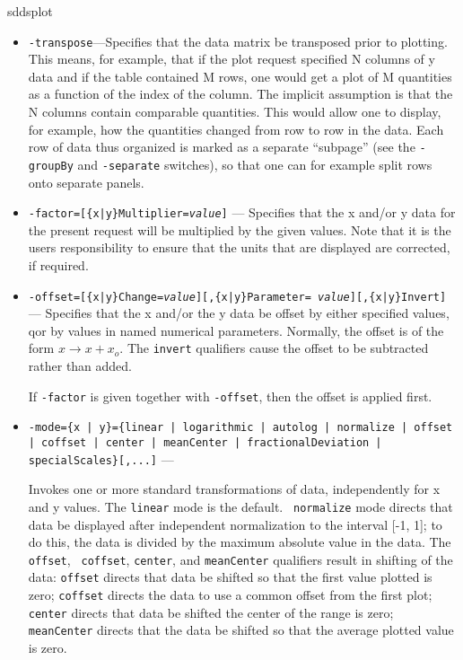 \begin{sddsprog}{sddsplot}
\begin{itemize}
\begin{itemize}
  \item {\tt -transpose}---Specifies that the data matrix be transposed prior to plotting.  This
means, for example, that if the plot request specified N columns of y data and if the table contained
M rows, one would get a plot of M quantities as a function of the index of the column.  The implicit
assumption is that the N columns contain comparable quantities.  This would allow one to display, for
example, how the quantities changed from row to row in the data.  Each row of data thus organized is
marked as a separate ``subpage'' (see the {\tt -groupBy} and {\tt -separate} switches), so that one
can for example split rows onto separate panels.

  \item {\tt -factor=[\{x|y\}Multiplier={\em value}]} --- Specifies that the x
and/or y data for the present request will be multiplied by the given values.  Note that it is the
users responsibility to ensure that the units that are displayed are corrected, if required.

  \item {\tt -offset=[\{x|y\}Change={\em value}][,\{x|y\}Parameter={\em
value}][,\{x|y\}Invert]} --- Specifies that the x and/or the y data be
offset by either specified values, qor by values in named numerical
parameters.  Normally, the offset is of the form $x \rightarrow
x+x_o$.  The {\tt invert} qualifiers cause the offset to be subtracted
rather than added.

If {\tt -factor} is given together with {\tt -offset}, then the offset is applied first.

  \item {\tt -mode=\{x | y\}=\{linear | logarithmic | autolog | normalize | offset | coffset | center | meanCenter | fractionalDeviation | specialScales\}[,...]} ---

Invokes one or more standard transformations of data, independently
for x and y values.  The {\tt linear} mode is the default.  {\tt
normalize} mode directs that data be displayed after independent
normalization to the interval [-1, 1]; to do this, the data is divided
by the maximum absolute value in the data.  The {\tt offset}, {\tt
coffset}, {\tt center}, and {\tt meanCenter} qualifiers result in 
shifting of the data: {\tt offset} directs that data be shifted so 
that the first value plotted is zero; {\tt coffset} directs the data 
to use a common offset from the first plot; {\tt center} directs that 
data be shifted the center of the range is zero; {\tt meanCenter} 
directs that the data be shifted so that the average plotted value 
is zero.


\end{itemize}
\end{itemize}
\end{sddsprog}
